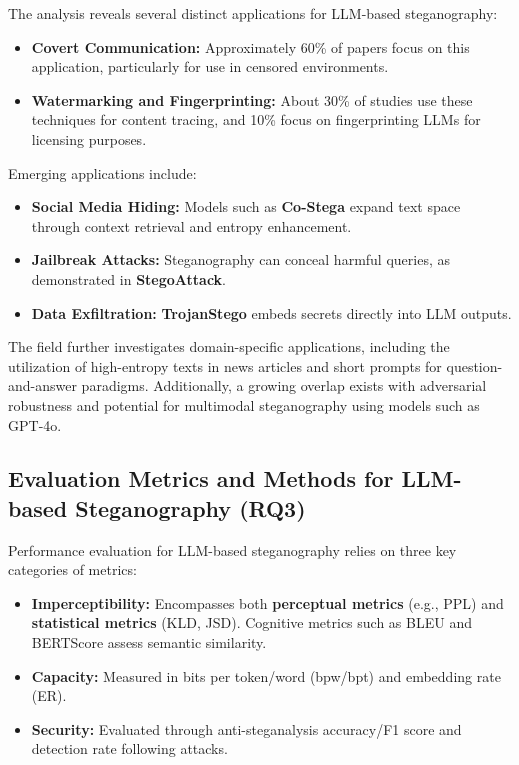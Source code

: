 The analysis reveals several distinct applications for LLM-based steganography:
\begin{itemize}
	\item \textbf{Covert Communication:} Approximately 60\% of papers focus on this application, particularly for use in censored environments.
	\item \textbf{Watermarking and Fingerprinting:} About 30\% of studies use these techniques for content tracing, and 10\% focus on fingerprinting LLMs for licensing purposes.
\end{itemize}

Emerging applications include:
\begin{itemize}
	\item \textbf{Social Media Hiding:} Models such as \textbf{Co-Stega} expand text space through context retrieval and entropy enhancement.
	\item \textbf{Jailbreak Attacks:} Steganography can conceal harmful queries, as demonstrated in \textbf{StegoAttack}.
	\item \textbf{Data Exfiltration:} \textbf{TrojanStego} embeds secrets directly into LLM outputs.
\end{itemize}

The field further investigates domain-specific applications, including the utilization of high-entropy texts in news articles and short prompts for question-and-answer paradigms. Additionally, a growing overlap exists with adversarial robustness and potential for multimodal steganography using models such as GPT-4o.

\subsection{Evaluation Metrics and Methods for LLM-based Steganography (RQ3)}
\label{subsec:rq3}

Performance evaluation for LLM-based steganography relies on three key categories of metrics:
\begin{itemize}
	\item \textbf{Imperceptibility:} Encompasses both \textbf{perceptual metrics} (e.g., PPL) and \textbf{statistical metrics} (KLD, JSD). Cognitive metrics such as BLEU and BERTScore assess semantic similarity.
	\item \textbf{Capacity:} Measured in bits per token/word (bpw/bpt) and embedding rate (ER).
	\item \textbf{Security:} Evaluated through anti-steganalysis accuracy/F1 score and detection rate following attacks.
\end{itemize}

